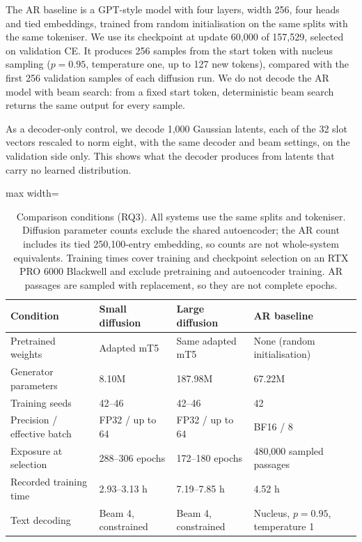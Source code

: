 \documentclass[11pt,a4paper]{article}
\begin{document}
The AR baseline is a GPT-style model with four layers, width 256, four heads and tied embeddings, trained from random initialisation on the same splits with the same tokeniser. We use its checkpoint at update 60,000 of 157,529, selected on validation CE. It produces 256 samples from the start token with nucleus sampling ($p = 0.95$, temperature one, up to 127 new tokens), compared with the first 256 validation samples of each diffusion run. We do not decode the AR model with beam search: from a fixed start token, deterministic beam search returns the same output for every sample.

As a decoder-only control, we decode 1,000 Gaussian latents, each of the 32 slot vectors rescaled to norm eight, with the same decoder and beam settings, on the validation side only. This shows what the decoder produces from latents that carry no learned distribution.

\begin{table}[t]
\centering
\small
\begin{adjustbox}{max width=\textwidth}
\begin{tabular}{llll}
\toprule
Condition & Small diffusion & Large diffusion & AR baseline \\
\midrule
Pretrained weights & Adapted mT5 & Same adapted mT5 & None (random initialisation) \\
Generator parameters & 8.10M & 187.98M & 67.22M \\
Training seeds & 42--46 & 42--46 & 42 \\
Precision / effective batch & FP32 / up to 64 & FP32 / up to 64 & BF16 / 8 \\
Exposure at selection & 288--306 epochs & 172--180 epochs & 480,000 sampled passages \\
Recorded training time & 2.93--3.13 h & 7.19--7.85 h & 4.52 h \\
Text decoding & Beam 4, constrained & Beam 4, constrained & Nucleus, $p=0.95$, temperature 1 \\
\bottomrule
\end{tabular}
\end{adjustbox}
\caption{Comparison conditions (RQ3). All systems use the same splits and tokeniser. Diffusion parameter counts exclude the shared autoencoder; the AR count includes its tied 250,100-entry embedding, so counts are not whole-system equivalents. Training times cover training and checkpoint selection on an RTX PRO 6000 Blackwell and exclude pretraining and autoencoder training. AR passages are sampled with replacement, so they are not complete epochs.}
\label{tab:conditions}
\end{table}
\end{document}
